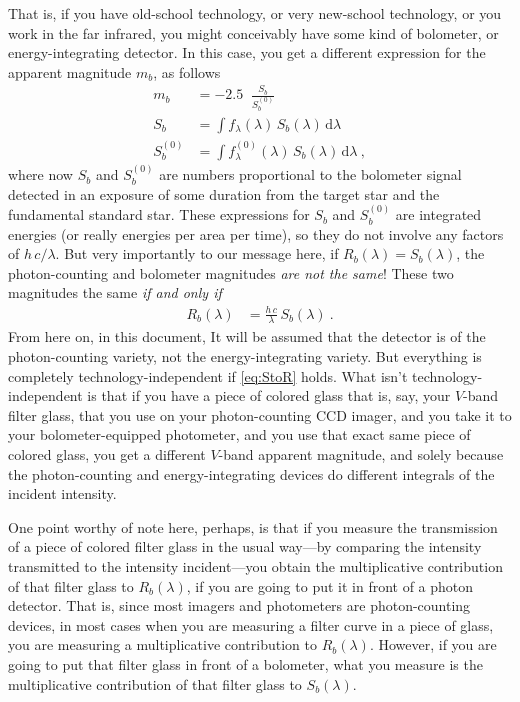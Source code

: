 \documentclass[10pt]{article}
\newcommand{\dd}{\mathrm{d}}
\DeclareMathOperator{\logten}{log_{10}}
\begin{document}
That is, if you have old-school technology, or very new-school technology, or you work in the far infrared, you might conceivably have some kind of bolometer, or energy-integrating detector.
In this case, you get a different expression for the apparent magnitude $m_b$, as follows
\begin{align}
    m_b &= -2.5\logten\frac{S_b}{S^{(0)}_b}\\
    S_b &= \int f_\lambda(\lambda)\,S_b(\lambda)\,\dd\lambda\\
    S^{(0)}_b &= \int f^{(0)}_\lambda(\lambda)\,S_b(\lambda)\,\dd\lambda~,
\end{align}
where now $S_b$ and $S^{(0)}_b$ are numbers proportional to the bolometer signal detected in an exposure of some duration from the target star and the fundamental standard star.
These expressions for $S_b$ and $S^{(0)}_b$ are integrated energies (or really energies per area per time), so they do not involve any factors of $h\,c/\lambda$.
But very importantly to our message here, if $R_b(\lambda)=S_b(\lambda)$, the photon-counting and bolometer magnitudes \emph{are not the same}!
These two magnitudes the same \emph{if and only if}
\begin{align}
    R_b(\lambda) &= \frac{h\,c}{\lambda}\,S_b(\lambda)~.\label{eq:StoR}
\end{align}
From here on, in this document, It will be assumed that the detector is of the photon-counting variety, not the energy-integrating variety.
But everything is completely technology-independent if \eqref{eq:StoR} holds.
What isn't technology-independent is that if you have a piece of colored glass that is, say, your $V$-band filter glass, that you use on your photon-counting CCD imager, and you take it to your bolometer-equipped photometer, and you use that exact same piece of colored glass, you get a different $V$-band apparent magnitude, and solely because the photon-counting and energy-integrating devices do different integrals of the incident intensity.

One point worthy of note here, perhaps, is that if you measure the transmission of a piece of colored filter glass in the usual way---by comparing the intensity transmitted to the intensity incident---you obtain the multiplicative contribution of that filter glass to $R_b(\lambda)$, if you are going to put it in front of a photon detector.
That is, since most imagers and photometers are photon-counting devices, in most cases when you are measuring a filter curve in a piece of glass, you are measuring a multiplicative contribution to $R_b(\lambda)$.
However, if you are going to put that filter glass in front of a bolometer, what you measure is the multiplicative contribution of that filter glass to $S_b(\lambda)$.
\end{document}
